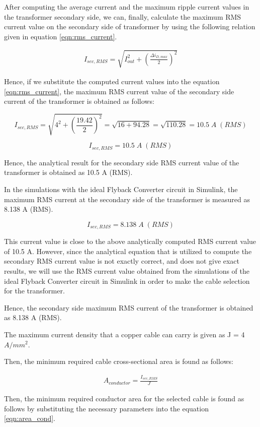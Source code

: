After computing the average current and the maximum ripple current values in the transformer secondary side, we can, finally, calculate the maximum RMS current value on the secondary side of transformer by using the following relation given in equation \eqref{eqn:rms_current}.

\begin{align}
    I_{sec,RMS} = \sqrt{I_{out}^2 + (\frac{\Delta i_{D,max}}{2})^2}
    \label{eqn:rms_current}
\end{align}

Hence, if we substitute the computed current values into the equation \eqref{eqn:rms_current}, the maximum RMS current value of the secondary side current of the transformer is obtained as follows:

$$ I_{sec,RMS} = \sqrt{4^2 + (\frac{19.42}{2})^2} = \sqrt{16 + 94.28} = \sqrt{110.28} = 10.5\;A\; (RMS) $$

$$ I_{sec,RMS} = 10.5\;A\; (RMS) $$

Hence, the analytical result for the secondary side RMS current value of the transformer is obtained as 10.5 A (RMS).

In the simulations with the ideal Flyback Converter circuit in Simulink, the maximum RMS current at the secondary side of the transformer is measured as 8.138 A (RMS).

$$ I_{sec,RMS} = 8.138\;A\; (RMS) $$

This current value is close to the above analytically computed RMS current value of 10.5 A. However, since the analytical equation that is utilized to compute the secondary RMS current value is not exactly correct, and does not give exact results, we will use the RMS current value obtained from the simulations of the ideal Flyback Converter circuit in Simulink in order to make the cable selection for the transformer.

Hence, the secondary side maximum RMS current of the transformer is obtained as 8.138 A (RMS).

The maximum current density that a copper cable can carry is given as J = 4 $A/mm^2$.

Then, the minimum required cable cross-sectional area is found as follows:

\begin{align}
    A_{conductor} = \frac{I_{sec,RMS}}{J}
    \label{eqn:area_cond}
\end{align}

Then, the minimum required conductor area for the selected cable is found as follows by substituting the necessary parameters into the equation \eqref{eqn:area_cond}.

